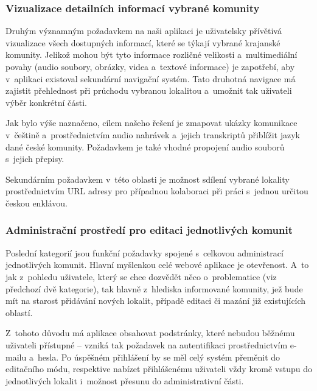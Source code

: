 \hypertarget{vizualizace-detailnuxedch-informacuxed-vybranuxe9-komunity}{%
\subsubsection{Vizualizace detailních informací vybrané komunity}\label{vizualizace-detailnuxedch-informacuxed-vybranuxe9-komunity}}

Druhým významným požadavkem na naši aplikaci je uživatelsky přívětivá vizualizace všech dostupných informací, které se týkají vybrané krajanské komunity. Jelikož mohou být tyto informace rozličné velikosti a~multimediální povahy (audio soubory, obrázky, videa a~textové informace) je zapotřebí, aby v~aplikaci existoval sekundární navigační systém. Tato druhotná navigace má zajistit přehlednost při průchodu vybranou lokalitou a~umožnit tak uživateli výběr konkrétní části.

Jak bylo výše naznačeno, cílem našeho řešení je zmapovat ukázky komunikace v~češtině a~prostřednictvím audio nahrávek a~jejich transkriptů přiblížit jazyk dané české komunity. Požadavkem je také vhodné propojení audio souborů s~jejich přepisy.

Sekundárním požadavkem v~této oblasti je možnost sdílení vybrané lokality prostřednictvím URL adresy pro případnou kolaboraci při práci s~jednou určitou českou enklávou.

\hypertarget{administraux10dnuxed-prostux159eduxed-pro-editaci-jednotlivuxfdch-komunit}{%
\subsubsection{Administrační prostředí pro editaci jednotlivých komunit}\label{administraux10dnuxed-prostux159eduxed-pro-editaci-jednotlivuxfdch-komunit}}

Poslední kategorií jsou funkční požadavky spojené s~celkovou administrací jednotlivých komunit. Hlavní myšlenkou celé webové aplikace je otevřenost. A~to jak z~pohledu uživatele, který se chce dozvědět něco o~problematice (viz předchozí dvě kategorie), tak hlavně z~hlediska informované komunity, jež bude mít na starost přidávání nových lokalit, případě editaci či mazání již existujících oblastí.

Z~tohoto důvodu má aplikace obsahovat podstránky, které nebudou běžnému uživateli přístupné -- vzniká tak požadavek na autentifikaci prostřednictvím e-mailu a~hesla. Po úspěšném přihlášení by se měl celý systém přeměnit do editačního módu, respektive nabízet přihlášenému uživateli vždy kromě vstupu do jednotlivých lokalit i~možnost přesunu do administrativní části.

